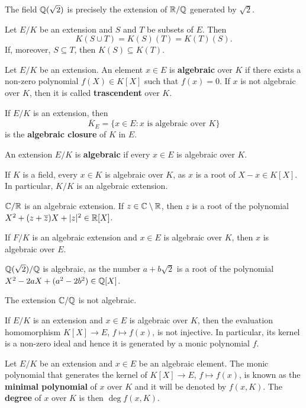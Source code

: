 \begin{example}
	The field $\mathbb{Q}(\sqrt{2})$ is precisely the extension 
	of $\mathbb{R}/\mathbb{Q}$ generated by $\sqrt{2}$. 
\end{example}

Let $E/K$ be an extension and $S$ and $T$ be subsets of $E$.
Then 
\[
	K(S\cup T)=K(S)(T)=K(T)(S).
\]
If, moreover, 
$S\subseteq T$, then $K(S)\subseteq K(T)$. 

\begin{definition}
	Let $E/K$ be an extension. An element $x\in E$
	is \textbf{algebraic} over $K$ if there
	exists a non-zero polynomial 
	$f(X)\in K[X]$ such that $f(x)=0$. If $x$ is
	not algebraic over $K$, 
	then it is called \textbf{trascendent} over $K$.
\end{definition}

If $E/K$ is an extension, then 
\[
	\overline{K}_E=\{x\in E:x\text{ is algebraic over }K\}
\]
is the \textbf{algebraic closure} of $K$ in $E$. 

\begin{definition}	
	An extension $E/K$ is \textbf{algebraic} if 
	every $x\in E$ is algebraic over $K$. 
\end{definition}

If $K$ is a field, every $x\in K$ is algebraic over $K$,
as $x$ is a root of $X-x\in K[X]$. In particular, $K/K$ is
an algebraic extension. 

\begin{example}
	$\mathbb{C}/\mathbb{R}$ is an algebraic extension. If $z\in\mathbb{C}\setminus\mathbb{R}$, then
	$z$ is a root of the polynomial 
	$X^2+(z+\overline{z})X+|z|^2\in\mathbb{R}[X]$. 
\end{example}

If $F/K$ is an algebraic extension and $x\in E$ is algebraic
over $K$, then $x$ is algebraic over $E$. 

\begin{example}
	$\mathbb{Q}(\sqrt{2})/\mathbb{Q}$ is algebraic, as the number
	$a+b\sqrt{2}$ is a root of the polynomial
	$X^2-2aX+(a^2-2b^2)\in\mathbb{Q}[X]$. 
\end{example}

The extension $\mathbb{C}/\mathbb{Q}$ is not algebraic. 

If $E/K$ is an extension and $x\in E$ is algebraic
over $K$, then the evaluation homomorphism 
$K[X]\to E$, $f\mapsto f(x)$, is not injective. In particular,
its kernel is a non-zero ideal and hence 
it is generated by a monic polynomial $f$. 

\begin{definition}
	Let $E/K$ be an extension and $x\in E$ be an algebraic element.  The monic
	polynomial that generates the kernel of $K[X]\to E$, $f\mapsto f(x)$, is
	known as the \textbf{minimal polynomial} of $x$ over $K$ and it will be
	denoted by $f(x,K)$. The \textbf{degree} of $x$ over $K$ is then $\deg
	f(x,K)$. 
\end{definition}

